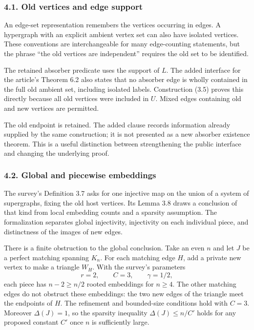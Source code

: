 \documentclass[english,11pt,a4paper]{article}
\begin{document}
\subsubsection{4.1. Old vertices and edge support}\label{old-vertices-and-edge-support}

An edge-set representation remembers the vertices occurring in edges. A hypergraph with an explicit ambient vertex set can also have isolated vertices. These conventions are interchangeable for many edge-counting statements, but the phrase ``the old vertices are independent'' requires the old set to be identified.

The retained absorber predicate uses the support of \(L\). The added interface for the article's Theorem 6.2 also states that no absorber edge is wholly contained in the full old ambient set, including isolated labels. Construction (3.5) proves this directly because all old vertices were included in \(U\). Mixed edges containing old and new vertices are permitted.

The old endpoint is retained. The added clause records information already supplied by the same construction; it is not presented as a new absorber existence theorem. This is a useful distinction between strengthening the public interface and changing the underlying proof.


\subsubsection{4.2. Global and piecewise embeddings}\label{global-and-piecewise-embeddings}

The survey's Definition 3.7 asks for one injective map on the union of a system of supergraphs, fixing the old host vertices. Its Lemma 3.8 draws a conclusion of that kind from local embedding counts and a sparsity assumption. The formalization separates global injectivity, injectivity on each individual piece, and distinctness of the images of new edges.

There is a finite obstruction to the global conclusion. Take an even \(n\) and let \(J\) be a perfect matching spanning \(K_n\). For each matching edge \(H\), add a private new vertex to make a triangle \(W_H\). With the survey's parameters \[r=2,\qquad C=3,\qquad \gamma=1/2,
\tag{4.1}\] each piece has \(n-2\ge n/2\) rooted embeddings for \(n\ge4\). The other matching edges do not obstruct these embeddings: the two new edges of the triangle meet the endpoints of \(H\). The refinement and bounded-size conditions hold with \(C=3\). Moreover \(\Delta(J)=1\), so the sparsity inequality \(\Delta(J)\le n/C'\) holds for any proposed constant \(C'\) once \(n\) is sufficiently large.
\end{document}
